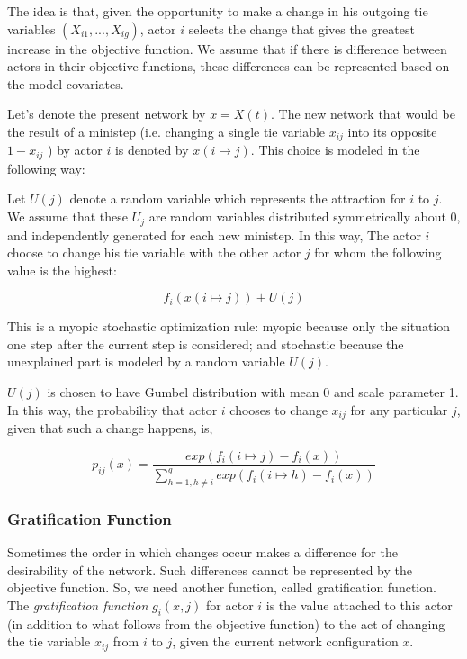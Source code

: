\documentclass{report}
\begin{document}
The idea is that, given the opportunity to make a change in his outgoing tie variables $(X_{i1},...,X_{ig})$, actor $i$ selects the change that gives the greatest increase in the objective function. We assume that if there is difference between actors in their objective functions, these differences can be represented based on the model covariates. 

Let's denote the present network by $x = X(t)$. The new network that would be the result of a ministep (i.e. changing a single tie variable $x_{ij}$ into its opposite $1 - x_{ij}$ ) by actor $i$ is denoted by $x(i \mapsto j)$. This choice is modeled in the following way: 

Let $U(j)$ denote a random variable which represents the attraction for $i$ to $j$. We assume that these $U_j$ are random variables distributed symmetrically about 0, and independently generated for each new ministep. In this way, The actor $i$ choose to change his tie variable with the other actor $j$ for whom the following value is the highest:

\begin{equation}
f_i(x(i \mapsto j)) + U(j)
\end{equation} 

This is a myopic stochastic optimization rule: myopic because only the situation one step after the current step is considered; and stochastic because the unexplained part is modeled by a random variable $U(j)$. 

$U(j)$ is chosen to have Gumbel distribution with mean 0 and scale parameter 1. In this way, the probability that actor $i$ chooses to change $x_{ij}$ for any particular $j$, given that such a change happens, is,

\begin{equation}
p_{ij}(x) = \frac{exp(f_i(i \mapsto j) - f_i(x))}{\sum_{h=1, h \neq i}^{g} exp(f_i(i \mapsto h) - f_i(x))}
\end{equation}

\subsubsection{Gratification Function}
Sometimes the order in which changes occur makes a difference for the desirability of the network. Such differences cannot be represented by the objective function. So, we need another function, called gratification function. \\

The \textit{gratification function} $g_i(x,j)$ for actor $i$ is the value attached to this actor (in addition to what follows from the objective function) to the act of changing the tie variable $x_{ij}$ from $i$ to $j$, given the current network configuration $x$. 
\end{document}
